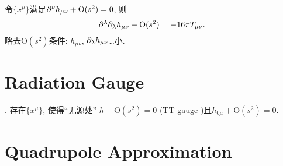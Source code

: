 令$\{x^{\mu}\}$满足$\partial^{\nu}\bar{h}_{\mu\nu}+\text{O}(s^2)=0$, 则
\begin{equation}
    \partial^{\lambda}\partial_{\lambda}\bar{h}_{\mu\nu}+\text{O}(s^2)=-16\pi T_{\mu \nu}.\label{lin_gravity}
\end{equation}
略去$\text{O}(s^2)$条件: $h_{\mu\nu}$, $\partial_\lambda h_{\mu\nu}$\dots{}小.

\section{Radiation Gauge}

\cite{Wald1984}. 存在$\{x^{\mu}\}$, 使得``无源处'' $h+\text{O}(s^2)=0$ (TT gauge \cite{Wang2020})且$h_{0\mu}+\text{O}(s^2)=0$.

\section{Quadrupole Approximation}


